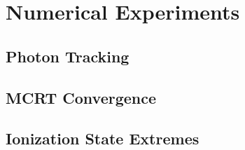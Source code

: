 \chapter{Numerical Experiments}

\section{Photon Tracking}

\section{MCRT Convergence}

\section{Ionization State Extremes}
\label{sec:ionization_extremes}
